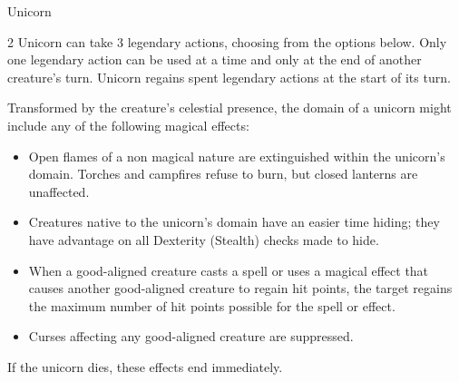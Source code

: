 \documentclass[10pt,a4paper,twoside,bg=print,twocolumn,openany,nodeprecatedcode]{dndbook}
\begin{document}
\begin{DndMonster}[float*=b,width=\textwidth + 8pt]{Unicorn}
\begin{multicols}{2}
Unicorn can take 3 legendary actions, choosing from the options below. Only one legendary action can be used at a time and only at the end of another creature's turn. Unicorn regains spent legendary actions at the start of its turn.

\begin{DndMonsterLegendaryActions}
\end{DndMonsterLegendaryActions}
Transformed by the creature's celestial presence, the domain of a unicorn might include any of the following magical effects:


\begin{itemize}
\item Open flames of a non magical nature are extinguished within the unicorn's domain. Torches and campfires refuse to burn, but closed lanterns are unaffected.
\item Creatures native to the unicorn's domain have an easier time hiding; they have advantage on all Dexterity (Stealth) checks made to hide.
\item When a good-aligned creature casts a spell or uses a magical effect that causes another good-aligned creature to regain hit points, the target regains the maximum number of hit points possible for the spell or effect.
\item Curses affecting any good-aligned creature are suppressed.
\end{itemize}

If the unicorn dies, these effects end immediately.

\end{multicols}
\end{DndMonster}
\end{document}
